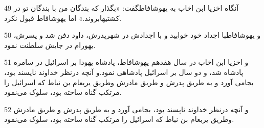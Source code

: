 \par 49 آنگاه اخزیا ابن اخاب به یهوشافاطگفت: «بگذار که بندگان من با بندگان تو در کشتیهابروند.» اما یهوشافاط قبول نکرد.
\par 50 و یهوشافاطبا اجداد خود خوابید و با اجدادش در شهرپدرش، داود دفن شد و پسرش، یهورام در جایش سلطنت نمود.
\par 51 و اخزیا ابن اخاب در سال هفدهم یهوشافاط، پادشاه یهودا بر اسرائیل در سامره پادشاه شد، و دو سال بر اسرائیل پادشاهی نمود.و آنچه درنظر خداوند ناپسند بود، بجامی آورد و به طریق پدرش و طریق مادرش وطریق یربعام بن نباط که اسرائیل را مرتکب گناه ساخته بود، سلوک می‌نمود.
\par 52 و آنچه درنظر خداوند ناپسند بود، بجامی آورد و به طریق پدرش و طریق مادرش وطریق یربعام بن نباط که اسرائیل را مرتکب گناه ساخته بود، سلوک می‌نمود.


